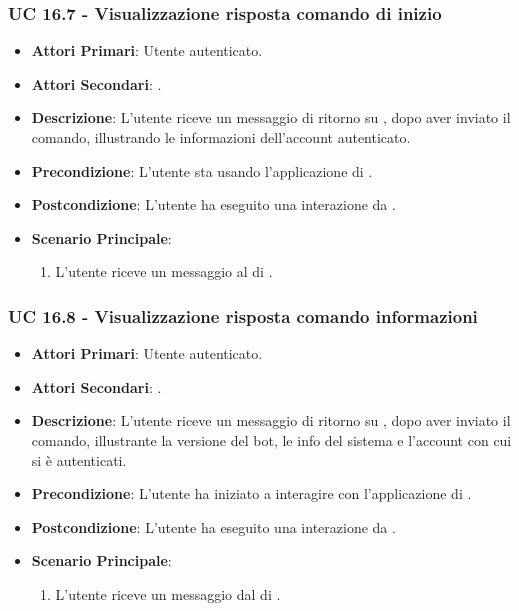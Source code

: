 	\subsubsection{UC 16.7 - Visualizzazione risposta comando di inizio }

	\begin{itemize}
			\item \textbf{Attori Primari}: Utente autenticato.
			\item \textbf{Attori Secondari}: .
			\item \textbf{Descrizione}: L'utente riceve un messaggio di ritorno su , dopo aver inviato il comando, illustrando le informazioni dell'account autenticato.
			\item \textbf{Precondizione}: L'utente sta usando l'applicazione di .
			\item \textbf{Postcondizione}: L'utente ha eseguito una interazione da .
			\item \textbf{Scenario Principale}:
			\begin{enumerate}
				\item L'utente riceve un messaggio al  di .
			\end{enumerate}
		\end{itemize}

	\subsubsection{UC 16.8 - Visualizzazione risposta comando informazioni}

	\begin{itemize}
			\item \textbf{Attori Primari}: Utente autenticato.
			\item \textbf{Attori Secondari}: .
			\item \textbf{Descrizione}: L'utente riceve un messaggio di ritorno su , dopo aver inviato il comando, illustrante la versione del bot, le info del sistema e l'account con cui si è autenticati.
			\item \textbf{Precondizione}: L'utente ha iniziato a interagire con l'applicazione di .
			\item \textbf{Postcondizione}: L'utente ha eseguito una interazione da .
			\item \textbf{Scenario Principale}:
			\begin{enumerate}
				\item L'utente riceve un messaggio dal  di .
			\end{enumerate}
		\end{itemize}	

